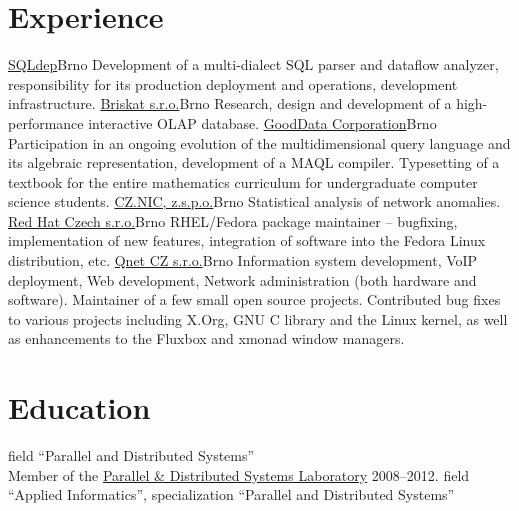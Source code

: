 \documentclass[11pt,a4paper]{moderncv}
\begin{document}
\section{Experience}
	{\href{https://sqldep.com/}{SQLdep}}{Brno}{}
	{Development of a multi-dialect SQL parser and dataflow analyzer,
	responsibility for its production deployment and operations, development
	infrastructure.}
	{\href{http://briskat.com/}{Briskat s.r.o.}}{Brno}{}
	{Research, design and development of a high-performance interactive OLAP
	database.}
    {\href{http://gooddata.com/}{GoodData Corporation}}{Brno}{}
	{Participation in an ongoing evolution of the multidimensional query
	language and its algebraic representation, development of a MAQL compiler.}
    {Typesetting of a textbook for the entire mathematics curriculum for
    undergraduate computer science students.}
    {\href{http://labs.nic.cz/}{CZ.NIC, z.s.p.o.}}{Brno}{}
    {Statistical analysis of network anomalies.}
    {\href{http://www.cz.redhat.com/}{Red Hat Czech s.r.o.}}{Brno}{}
    {RHEL/Fedora package maintainer -- bugfixing, implementation of new
    features, integration of software into the Fedora Linux distribution,
    etc.}
    {\href{http://www.qnet.cz/}{Qnet CZ s.r.o.}}{Brno}{}
    {Information system development, VoIP deployment, Web development, Network
    administration (both hardware and software).}
    {Maintainer of a few small open source projects. Contributed bug fixes to
    various projects including X.Org, GNU C library and the Linux kernel, as
    well as enhancements to the Fluxbox and xmonad window managers.}

\vfil
{}

\section{Education}
    {field ``Parallel and Distributed Systems''\\
    Member of the \href{http://paradise.fi.muni.cz/}{Parallel \&
    Distributed Systems Laboratory} 2008--2012.}
    {field ``Applied Informatics'', specialization ``Parallel and Distributed
    Systems''}
\end{document}
